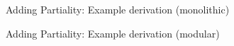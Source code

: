 \documentclass[main]{subfiles}
\begin{document}
\begin{frame}[fragile]{Adding Partiality: Example derivation (monolithic)}
\begin{code}
\AgdaSpace{}%
\AgdaSpace{}%
\AgdaSpace{}%
\AgdaSpace{}%
\AgdaSpace{}%
%
\>[27]\AgdaSpace{}%
\AgdaSpace{}%
\AgdaSpace{}%
\AgdaSpace{}%
\AgdaSpace{}%
\AgdaSpace{}%
\AgdaSpace{}%
%
\>[44]\<%
\end{code}
\end{frame}
\begin{frame}[fragile]{Adding Partiality: Example derivation (modular)}
\begin{code}%
\>[0]\AgdaFunction{\AgdaUnderscore{}}\AgdaSpace{}%
\AgdaSymbol{:}\AgdaSpace{}%
\AgdaSpace{}%
\AgdaSpace{}%
\AgdaSpace{}%
\AgdaSpace{}%
\AgdaSpace{}%
\AgdaSpace{}%
\AgdaSpace{}%
\AgdaSpace{}%
\AgdaSpace{}%
\AgdaSpace{}%
\AgdaSpace{}%
\AgdaSpace{}%
\AgdaSpace{}%
\AgdaSpace{}%
\AgdaSpace{}%
\AgdaSpace{}%
\AgdaSpace{}%
\AgdaSpace{}%
\AgdaSpace{}%
\AgdaSpace{}%
\AgdaSpace{}%
\AgdaSpace{}%
\AgdaSpace{}%
\AgdaSpace{}%
\AgdaSpace{}%
\AgdaSpace{}%
\AgdaSpace{}%
\AgdaSpace{}%
\AgdaSpace{}%
\AgdaSpace{}%
\AgdaSpace{}%
\AgdaSpace{}%
\AgdaSpace{}%
\AgdaSpace{}%
\<%
\\
\>[0]\AgdaSymbol{\AgdaUnderscore{}}%
\>[496I]\AgdaSymbol{=}\AgdaSpace{}%
%
\>[498I]\AgdaSpace{}%
\AgdaSpace{}%
\AgdaSpace{}%

\end{code}
\end{frame}
\end{document}
